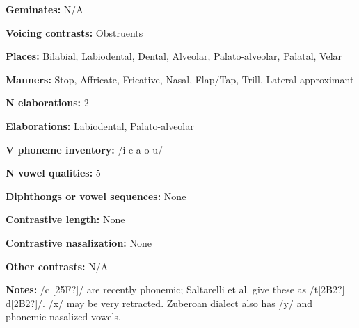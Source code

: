 \begin{styleBody}
\textbf{Geminates:} N/A
\end{styleBody}

\begin{styleBody}
\textbf{Voicing contrasts:} Obstruents
\end{styleBody}

\begin{styleBody}
\textbf{Places:} Bilabial, Labiodental, Dental, Alveolar, Palato-alveolar, Palatal, Velar
\end{styleBody}

\begin{styleBody}
\textbf{Manners:} Stop, Affricate, Fricative, Nasal, Flap/Tap, Trill, Lateral approximant
\end{styleBody}

\begin{styleBody}
\textbf{N elaborations:} 2
\end{styleBody}

\begin{styleBody}
\textbf{Elaborations:} Labiodental, Palato-alveolar
\end{styleBody}

\begin{styleBody}
\textbf{V phoneme inventory:} /i e a o u/
\end{styleBody}

\begin{styleBody}
\textbf{N vowel qualities:} 5
\end{styleBody}

\begin{styleBody}
\textbf{Diphthongs or vowel sequences:} None
\end{styleBody}

\begin{styleBody}
\textbf{Contrastive length:} None
\end{styleBody}

\begin{styleBody}
\textbf{Contrastive nasalization:} None
\end{styleBody}

\begin{styleBody}
\textbf{Other contrasts:} N/A
\end{styleBody}

\begin{styleBody}
\textbf{Notes:} /c [25F?]/ are recently phonemic; Saltarelli et al. give these as /t[2B2?] d[2B2?]/. /x/ may be very retracted. Zuberoan dialect also has /y/ and phonemic nasalized vowels.
\end{styleBody}

